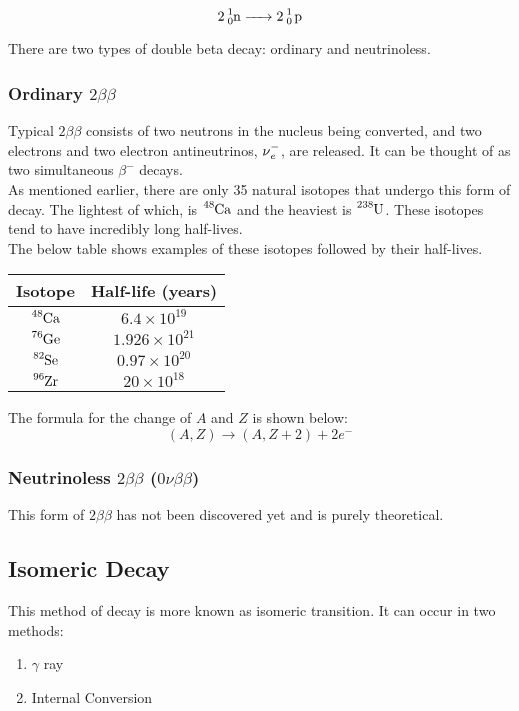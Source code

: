 \documentclass{article}
\begin{document}
\begin{multicols*}{2}
    \[
      \ce{2 ^{1}_{0}n -> 2 ^{1}_{0} p}
    \]

    There are two types of double beta decay: ordinary and neutrinoless.

    \subsubsection{Ordinary $2\beta\beta$}
    Typical $2\beta\beta$ consists of two neutrons in the nucleus being converted,
    and two electrons and two electron antineutrinos, $\ce{\nu^{-}_{e}}$,
    are released. It can be thought of as two simultaneous $\beta^{-}$ decays.\\

    As mentioned earlier, there are only 35 natural isotopes that undergo
    this form of decay. The lightest of which, is $\ce{^{48}Ca}$ and the heaviest
    is $\ce{^{238}U}$. These isotopes tend to have incredibly long half-lives.\\

    The below table shows examples of these isotopes followed by their half-lives.\\
    
    \begin{tabular}{|c|c|}
      \hline
      \textbf{Isotope} & \textbf{Half-life (years)} \\
      \hline
      $\ce{^{48}Ca}$ & $6.4 \times 10^{19}$ \\
      $\ce{^{76}Ge}$ & $1.926 \times 10^{21}$ \\
      $\ce{^{82}Se}$ & $0.97 \times 10^{20}$ \\
      $\ce{^{96}Zr}$ & $20 \times 10^{18}$ \\
      \hline
    \end{tabular}

    The formula for the change of $A$ and $Z$ is shown below:
    \[
      \left(A, Z\right) \rightarrow \left(A, Z + 2\right) + 2e^{-}
    \]

    \subsubsection{Neutrinoless $2\beta\beta$ ($0\nu\beta\beta$)}
    This form of $2\beta\beta$ has not been discovered yet and is purely theoretical.
      

    \subsection{Isomeric Decay}
    This method of decay is more known as isomeric transition. It can occur
    in two methods:
    \begin{enumerate}
      \item $\gamma$ ray
      \item Internal Conversion
    \end{enumerate}

\end{multicols*}
\end{document}
